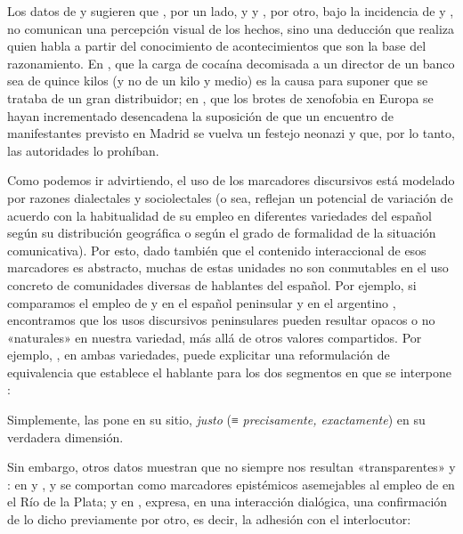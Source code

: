 
Los datos de  y  sugieren que , por un lado, y  y , por otro, bajo la incidencia de
 y , no comunican una percepción visual de
los hechos, sino una deducción que realiza quien habla a partir del conocimiento
de acontecimientos que son la base del razonamiento. En , que la carga de cocaína
decomisada a un director de un banco sea de quince kilos (y no de un kilo y
medio) es la causa para suponer que se trataba de un gran distribuidor; en
, que los brotes de xenofobia en Europa se hayan incrementado
desencadena la suposición de que un encuentro de manifestantes previsto en
Madrid se vuelva un festejo neonazi y que, por lo tanto, las autoridades lo
prohíban.

Como podemos ir advirtiendo, el uso de los marcadores discursivos está modelado
por razones dialectales y sociolectales (o sea, reflejan un potencial de
variación de acuerdo con la habitualidad de su empleo en diferentes variedades
del español según su distribución geográfica o según el grado de formalidad de la
situación comunicativa). Por esto, dado también que el contenido interaccional de
esos marcadores es abstracto, muchas de estas unidades no son conmutables en el
uso concreto de comunidades diversas de hablantes del español. Por ejemplo, si
comparamos el empleo de  y  en el español
peninsular y en el argentino
\parencite{garcianegroni2013,marcovecchio2022,marcovecchio2023}, encontramos que
los usos discursivos peninsulares pueden resultar opacos o no «naturales» en
nuestra variedad, más allá de otros valores compartidos. Por ejemplo,
, en ambas variedades, puede explicitar una reformulación de
equivalencia que establece el hablante para los dos segmentos en que se
interpone :

\begin{exe}
  \ex\label{ex:14-justo1} Simplemente, las pone en su sitio, \textit{justo} (≡
      \textit{precisamente, exactamente}) en su verdadera dimensión.
\end{exe}

Sin embargo, otros datos muestran que no siempre nos resultan «transparentes»
 y : en  y
,  y  se comportan como
marcadores epistémicos asemejables al empleo de  en el Río de
la Plata; y en ,  expresa, en una interacción
dialógica, una confirmación de lo dicho previamente por otro, es decir, la
adhesión con el interlocutor:

